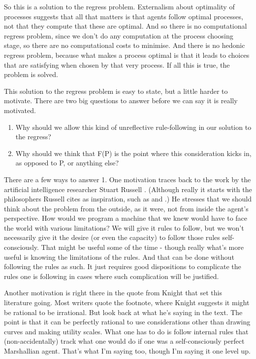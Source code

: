 \documentclass[
  11pt,
]{book}
\providecommand{\tightlist}{%
  \setlength{\itemsep}{0pt}\setlength{\parskip}{0pt}}
\begin{document}
So this is a solution to the regress problem. Externalism about optimality of processes suggests that all that matters is that agents follow optimal processes, not that they compute that these are optimal. And so there is no computational regress problem, since we don't do any computation at the process choosing stage, so there are no computational costs to minimise. And there is no hedonic regress problem, because what makes a process optimal is that it leads to choices that are satisfying when chosen by that very process. If all this is true, the problem is solved.

This solution to the regress problem is easy to state, but a little harder to motivate. There are two big questions to answer before we can say it is really motivated.

\begin{enumerate}
\def\labelenumi{\arabic{enumi}.}
\tightlist
\item
  Why should we allow this kind of unreflective rule-following in our solution to the regress?
\item
  Why should we think that F(P) is the point where this consideration kicks in, as opposed to P, or anything else?
\end{enumerate}

There are a few ways to answer 1. One motivation traces back to the work by the artificial intelligence researcher Stuart Russell \citeyearpar{Russell1997}. (Although really it starts with the philosophers Russell cites as inspiration, such as \citet{Cherniak1986} and \citet{Harman1973}.) He stresses that we should think about the problem from the outside, as it were, not from inside the agent's perspective. How would we program a machine that we knew would have to face the world with various limitations? We will give it rules to follow, but we won't necessarily give it the desire (or even the capacity) to follow those rules self-consciously. That might be useful some of the time - though really what's more useful is knowing the limitations of the rules. And that can be done without following the rules as such. It just requires good dispositions to complicate the rules one is following in cases where such complication will be justified.

Another motivation is right there in the quote from Knight that set this literature going. Most writers quote the footnote, where Knight suggests it might be rational to be irrational. But look back at what he's saying in the text. The point is that it can be perfectly rational to use considerations other than drawing curves and making utility scales. What one has to do is follow internal rules that (non-accidentally) track what one would do if one was a self-consciously perfect Marshallian agent. That's what I'm saying too, though I'm saying it one level up.
\end{document}
